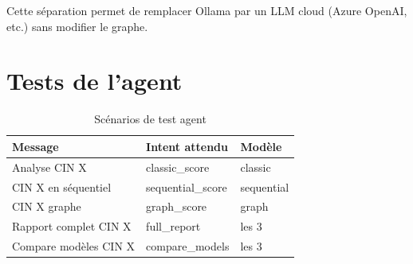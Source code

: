 Cette séparation permet de remplacer Ollama par un LLM cloud (Azure OpenAI, etc.) sans modifier le graphe.

\section{Tests de l'agent}

\begin{table}[H]
  \centering
  \caption{Scénarios de test agent}
  \begin{tabular}{|p{5cm}|p{4cm}|p{4cm}|}
    \hline
    \textbf{Message} & \textbf{Intent attendu} & \textbf{Modèle} \\
    \hline
    Analyse CIN X & classic\_score & classic \\
    \hline
    CIN X en séquentiel & sequential\_score & sequential \\
    \hline
    CIN X graphe & graph\_score & graph \\
    \hline
    Rapport complet CIN X & full\_report & les 3 \\
    \hline
    Compare modèles CIN X & compare\_models & les 3 \\
    \hline
  \end{tabular}
\end{table}

